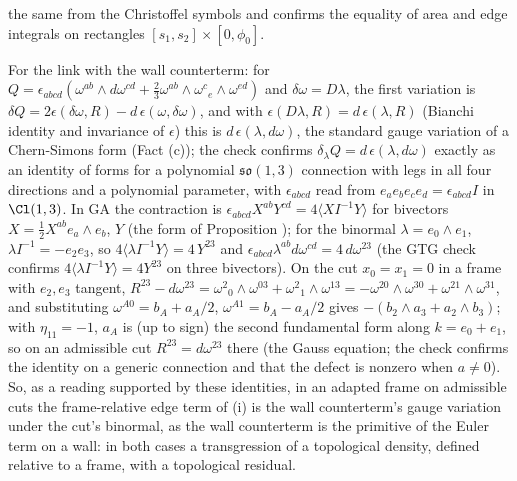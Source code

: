 the same from the Christoffel symbols and confirms the equality of area and edge integrals on rectangles $[s_{1}, s_{2}]\times[0, \phi_{0}]$.

For the link with the wall counterterm: for $Q = \epsilon_{abcd}(\omega^{ab}\wedge d\omega^{cd} + \tfrac23\omega^{ab}\wedge\omega^{c}{}_{e}\wedge\omega^{ed})$ and $\delta\omega = D\lambda$, the first variation is $\delta Q = 2\epsilon(\delta\omega, R) - d\,\epsilon(\omega, \delta\omega)$, and with $\epsilon(D\lambda, R) = d\,\epsilon(\lambda, R)$ (Bianchi identity and invariance of $\epsilon$) this is $d\,\epsilon(\lambda, d\omega)$, the standard gauge variation of a Chern-Simons form (Fact (c)); the check confirms $\delta_{\lambda}Q = d\,\epsilon(\lambda, d\omega)$ exactly as an identity of forms for a polynomial $\mathfrak{so}(1,3)$ connection with legs in all four directions and a polynomial parameter, with $\epsilon_{abcd}$ read from $e_{a}e_{b}e_{c}e_{d} = \epsilon_{abcd}I$ in $\Cl(1,3)$. In GA the contraction is $\epsilon_{abcd}X^{ab}Y^{cd} = 4\langle X I^{-1}Y\rangle$ for bivectors $X = \tfrac12 X^{ab}e_{a}\wedge e_{b}$, $Y$ (the form of Proposition ); for the binormal $\lambda = e_{0}\wedge e_{1}$, $\lambda I^{-1} = -e_{2}e_{3}$, so $4\langle\lambda I^{-1}Y\rangle = 4\,Y^{23}$ and $\epsilon_{abcd}\lambda^{ab}d\omega^{cd} = 4\,d\omega^{23}$ (the GTG check confirms $4\langle\lambda I^{-1}Y\rangle = 4Y^{23}$ on three bivectors). On the cut $x_{0} = x_{1} = 0$ in a frame with $e_{2}, e_{3}$ tangent, $R^{23} - d\omega^{23} = \omega^{2}{}_{0}\wedge\omega^{03} + \omega^{2}{}_{1}\wedge\omega^{13} = -\omega^{20}\wedge\omega^{30} + \omega^{21}\wedge\omega^{31}$, and substituting $\omega^{A0} = b_{A} + a_{A}/2$, $\omega^{A1} = b_{A} - a_{A}/2$ gives $-(b_{2}\wedge a_{3} + a_{2}\wedge b_{3})$; with $\eta_{11} = -1$, $a_{A}$ is (up to sign) the second fundamental form along $k = e_{0} + e_{1}$, so on an admissible cut $R^{23} = d\omega^{23}$ there (the Gauss equation; the check confirms the identity on a generic connection and that the defect is nonzero when $a \neq 0$). So, as a reading supported by these identities, in an adapted frame on admissible cuts the frame-relative edge term of (i) is the wall counterterm's gauge variation under the cut's binormal, as the wall counterterm is the primitive of the Euler term on a wall: in both cases a transgression of a topological density, defined relative to a frame, with a topological residual.

